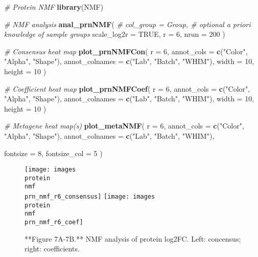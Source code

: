 \documentclass[]{article}
\newenvironment{Shaded}{\begin{snugshade}}{\end{snugshade}}
\newcommand{\CommentTok}[1]{\textcolor[rgb]{0.56,0.35,0.01}{\textit{#1}}}
\newcommand{\DataTypeTok}[1]{\textcolor[rgb]{0.13,0.29,0.53}{#1}}
\newcommand{\DecValTok}[1]{\textcolor[rgb]{0.00,0.00,0.81}{#1}}
\newcommand{\KeywordTok}[1]{\textcolor[rgb]{0.13,0.29,0.53}{\textbf{#1}}}
\newcommand{\NormalTok}[1]{#1}
\newcommand{\OtherTok}[1]{\textcolor[rgb]{0.56,0.35,0.01}{#1}}
\newcommand{\StringTok}[1]{\textcolor[rgb]{0.31,0.60,0.02}{#1}}
\begin{document}
\begin{Shaded}
\begin{Highlighting}[]
\CommentTok{# Protein NMF}
\KeywordTok{library}\NormalTok{(NMF)}

\CommentTok{# NMF analysis}
\KeywordTok{anal_prnNMF}\NormalTok{(}
  \CommentTok{# col_group = Group, # optional a priori knowledge of sample groups}
  \DataTypeTok{scale_log2r =} \OtherTok{TRUE}\NormalTok{,}
  \DataTypeTok{r =} \DecValTok{6}\NormalTok{,}
  \DataTypeTok{nrun =} \DecValTok{200}
\NormalTok{)}

\CommentTok{# Consensus heat map}
\KeywordTok{plot_prnNMFCon}\NormalTok{(}
  \DataTypeTok{r =} \DecValTok{6}\NormalTok{, }
  \DataTypeTok{annot_cols =} \KeywordTok{c}\NormalTok{(}\StringTok{"Color"}\NormalTok{, }\StringTok{"Alpha"}\NormalTok{, }\StringTok{"Shape"}\NormalTok{), }
  \DataTypeTok{annot_colnames =} \KeywordTok{c}\NormalTok{(}\StringTok{"Lab"}\NormalTok{, }\StringTok{"Batch"}\NormalTok{, }\StringTok{"WHIM"}\NormalTok{), }
  \DataTypeTok{width =} \DecValTok{10}\NormalTok{, }
  \DataTypeTok{height =} \DecValTok{10}
\NormalTok{)}

\CommentTok{# Coefficient heat map}
\KeywordTok{plot_prnNMFCoef}\NormalTok{(}
  \DataTypeTok{r =} \DecValTok{6}\NormalTok{, }
  \DataTypeTok{annot_cols =} \KeywordTok{c}\NormalTok{(}\StringTok{"Color"}\NormalTok{, }\StringTok{"Alpha"}\NormalTok{, }\StringTok{"Shape"}\NormalTok{), }
  \DataTypeTok{annot_colnames =} \KeywordTok{c}\NormalTok{(}\StringTok{"Lab"}\NormalTok{, }\StringTok{"Batch"}\NormalTok{, }\StringTok{"WHIM"}\NormalTok{), }
  \DataTypeTok{width =} \DecValTok{10}\NormalTok{, }
  \DataTypeTok{height =} \DecValTok{10}
\NormalTok{)}

\CommentTok{# Metagene heat map(s)}
\KeywordTok{plot_metaNMF}\NormalTok{(}
  \DataTypeTok{r =} \DecValTok{6}\NormalTok{, }
  \DataTypeTok{annot_cols =} \KeywordTok{c}\NormalTok{(}\StringTok{"Color"}\NormalTok{, }\StringTok{"Alpha"}\NormalTok{, }\StringTok{"Shape"}\NormalTok{), }
  \DataTypeTok{annot_colnames =} \KeywordTok{c}\NormalTok{(}\StringTok{"Lab"}\NormalTok{, }\StringTok{"Batch"}\NormalTok{, }\StringTok{"WHIM"}\NormalTok{), }
  
  \DataTypeTok{fontsize =} \DecValTok{8}\NormalTok{, }
  \DataTypeTok{fontsize_col =} \DecValTok{5}
\NormalTok{)}
\end{Highlighting}
\end{Shaded}

\begin{figure}

\texttt{[image: images\\protein\\nmf\\prn\_nmf\_r6\_consensus]} \texttt{[image: images\\protein\\nmf\\prn\_nmf\_r6\_coef]} \hfill{}

\caption{**Figure 7A-7B.** NMF analysis of protein log2FC. Left: concensus; right: coefficients.}\label{fig:Protein NMF heat maps}
\end{figure}
\end{document}
